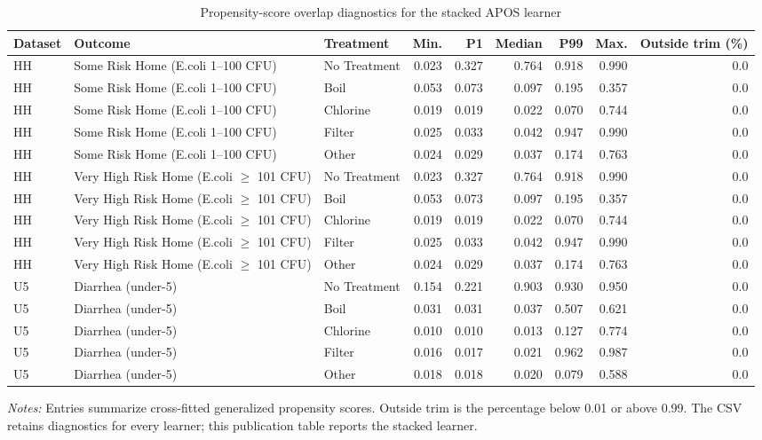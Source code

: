 \begin{table}[htbp]
\centering
\caption{Propensity-score overlap diagnostics for the stacked APOS learner}
\label{tab:overlap-apos}
\small\setlength{\tabcolsep}{5pt}
\begin{adjustbox}{max width=\linewidth, center}
\begin{tabular}{lllrrrrrr}
\toprule
Dataset & Outcome & Treatment & Min. & P1 & Median & P99 & Max. & Outside trim (\%) \\
\midrule
HH & Some Risk Home (E.coli 1--100 CFU) & No Treatment & 0.023 & 0.327 & 0.764 & 0.918 & 0.990 & 0.0 \\
HH & Some Risk Home (E.coli 1--100 CFU) & Boil & 0.053 & 0.073 & 0.097 & 0.195 & 0.357 & 0.0 \\
HH & Some Risk Home (E.coli 1--100 CFU) & Chlorine & 0.019 & 0.019 & 0.022 & 0.070 & 0.744 & 0.0 \\
HH & Some Risk Home (E.coli 1--100 CFU) & Filter & 0.025 & 0.033 & 0.042 & 0.947 & 0.990 & 0.0 \\
HH & Some Risk Home (E.coli 1--100 CFU) & Other & 0.024 & 0.029 & 0.037 & 0.174 & 0.763 & 0.0 \\
HH & Very High Risk Home (E.coli $\geq$ 101 CFU) & No Treatment & 0.023 & 0.327 & 0.764 & 0.918 & 0.990 & 0.0 \\
HH & Very High Risk Home (E.coli $\geq$ 101 CFU) & Boil & 0.053 & 0.073 & 0.097 & 0.195 & 0.357 & 0.0 \\
HH & Very High Risk Home (E.coli $\geq$ 101 CFU) & Chlorine & 0.019 & 0.019 & 0.022 & 0.070 & 0.744 & 0.0 \\
HH & Very High Risk Home (E.coli $\geq$ 101 CFU) & Filter & 0.025 & 0.033 & 0.042 & 0.947 & 0.990 & 0.0 \\
HH & Very High Risk Home (E.coli $\geq$ 101 CFU) & Other & 0.024 & 0.029 & 0.037 & 0.174 & 0.763 & 0.0 \\
U5 & Diarrhea (under-5) & No Treatment & 0.154 & 0.221 & 0.903 & 0.930 & 0.950 & 0.0 \\
U5 & Diarrhea (under-5) & Boil & 0.031 & 0.031 & 0.037 & 0.507 & 0.621 & 0.0 \\
U5 & Diarrhea (under-5) & Chlorine & 0.010 & 0.010 & 0.013 & 0.127 & 0.774 & 0.0 \\
U5 & Diarrhea (under-5) & Filter & 0.016 & 0.017 & 0.021 & 0.962 & 0.987 & 0.0 \\
U5 & Diarrhea (under-5) & Other & 0.018 & 0.018 & 0.020 & 0.079 & 0.588 & 0.0 \\
\bottomrule
\end{tabular}
\end{adjustbox}
\par\vspace{3pt}
\begin{minipage}{\linewidth}\footnotesize \textit{Notes:} Entries summarize cross-fitted generalized propensity scores. Outside trim is the percentage below 0.01 or above 0.99. The CSV retains diagnostics for every learner; this publication table reports the stacked learner.\end{minipage}
\end{table}
